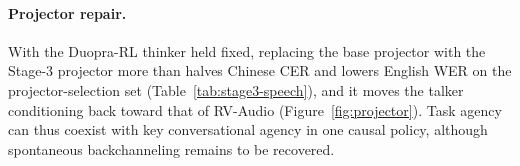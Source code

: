 \paragraph{Projector repair.}
With the Duopra-RL thinker held fixed, replacing the base projector with the Stage-3 projector more than halves Chinese CER and lowers English WER on the projector-selection set (Table~\ref{tab:stage3-speech}), and it moves the talker conditioning back toward that of RV-Audio (Figure~\ref{fig:projector}).
Task agency can thus coexist with key conversational agency in one causal policy, although spontaneous backchanneling remains to be recovered.
